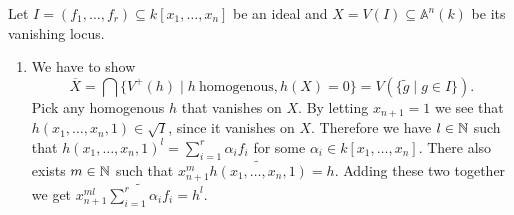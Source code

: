 \newcommand{\sheet}{2}




\maketitle

\begin{exercise}{1}
    Let $I = (f_1, \dots, f_r) \subseteq k[x_1, \dots, x_n]$ be an ideal and $X
    = V(I) \subseteq \mathbb{A}^n(k)$ be its vanishing locus.
    \begin{enumerate}
        \item{} We have to show
            \[
                \overline{X} = \bigcap \{V^+(h) \mid h\ \text{homogenous}, h(X) = 0\} =
                V(\{ \tilde{g} \mid g \in I \}).
            \]
            Pick any homogenous $h$ that vanishes on $X$. By letting $x_{n+1} =
            1$ we see that $h(x_1, \dots, x_n, 1) \in \sqrt{I}$, since it vanishes on
            $X$. Therefore we have $l \in \mathbb{N}$ such that $h(x_1, \dots, x_n, 1)^l
            = \sum_{i = 1}^{r} \alpha_i f_i$ for some $\alpha_i \in k[x_1,
            \dots, x_n]$. There also exists $m \in \mathbb{N}$ such that $x^m_{n+1}
            \widetilde{h(x_1, \dots, x_n, 1)} = h$. Adding these two together we
            get $x^{ml}_{n+1} \widetilde{\sum_{i = 1}^{r} \alpha_i f_i} = h^l$.
    \end{enumerate}
\end{exercise}


